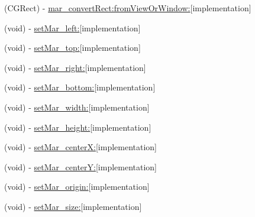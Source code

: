 \begin{DoxyCompactItemize}
\item 
(C\+G\+Rect) -\/ \hyperlink{category_u_i_view_07_m_a_r_e_x_08_a4136ba3c8681ad64d678ea5976348d50}{mar\+\_\+convert\+Rect\+:from\+View\+Or\+Window\+:}{\ttfamily  \mbox{[}implementation\mbox{]}}
\item 
(void) -\/ \hyperlink{category_u_i_view_07_m_a_r_e_x_08_abd745301cc36d1169b89afa9fec952d9}{set\+Mar\+\_\+left\+:}{\ttfamily  \mbox{[}implementation\mbox{]}}
\item 
(void) -\/ \hyperlink{category_u_i_view_07_m_a_r_e_x_08_a2b90239bc689035814d2e1b920f36686}{set\+Mar\+\_\+top\+:}{\ttfamily  \mbox{[}implementation\mbox{]}}
\item 
(void) -\/ \hyperlink{category_u_i_view_07_m_a_r_e_x_08_a2df479c3cb6434eea8254e041a831b11}{set\+Mar\+\_\+right\+:}{\ttfamily  \mbox{[}implementation\mbox{]}}
\item 
(void) -\/ \hyperlink{category_u_i_view_07_m_a_r_e_x_08_a490d001615da9b0a5be3d9fd9b3bafce}{set\+Mar\+\_\+bottom\+:}{\ttfamily  \mbox{[}implementation\mbox{]}}
\item 
(void) -\/ \hyperlink{category_u_i_view_07_m_a_r_e_x_08_af237a2b52689797bf9f265f5554270c0}{set\+Mar\+\_\+width\+:}{\ttfamily  \mbox{[}implementation\mbox{]}}
\item 
(void) -\/ \hyperlink{category_u_i_view_07_m_a_r_e_x_08_a2ec16d6250bac3bfb2c583a8f82af6f8}{set\+Mar\+\_\+height\+:}{\ttfamily  \mbox{[}implementation\mbox{]}}
\item 
(void) -\/ \hyperlink{category_u_i_view_07_m_a_r_e_x_08_a6062197effa73a225c7e5d1abe5664d3}{set\+Mar\+\_\+center\+X\+:}{\ttfamily  \mbox{[}implementation\mbox{]}}
\item 
(void) -\/ \hyperlink{category_u_i_view_07_m_a_r_e_x_08_a24d37e9de22464cd49eae0230e68e9d3}{set\+Mar\+\_\+center\+Y\+:}{\ttfamily  \mbox{[}implementation\mbox{]}}
\item 
(void) -\/ \hyperlink{category_u_i_view_07_m_a_r_e_x_08_aebb7d1b2bddf40325648e95fc086c985}{set\+Mar\+\_\+origin\+:}{\ttfamily  \mbox{[}implementation\mbox{]}}
\item 
(void) -\/ \hyperlink{category_u_i_view_07_m_a_r_e_x_08_a573eac380e1933ccabb6b157f6be6f3c}{set\+Mar\+\_\+size\+:}{\ttfamily  \mbox{[}implementation\mbox{]}}
\end{DoxyCompactItemize}
